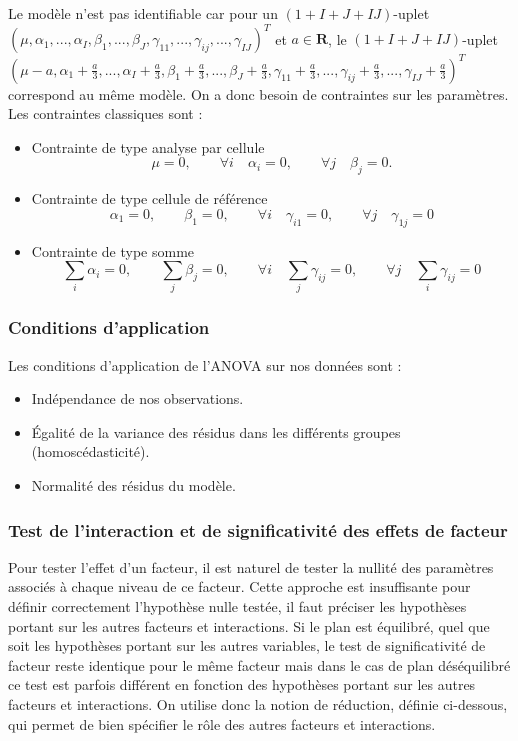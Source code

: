 \documentclass[12pt,a4paper]{article}
\newcommand{\bigbullet}{\ding{108}}
\begin{document}
	Le modèle n'est pas identifiable car pour un $(1+I+J+IJ)$-uplet $(\mu,\alpha_1,...,\alpha_I,\beta_1,...,\beta_J,\gamma_{11},...,\gamma_{ij},...,\gamma_{IJ})^T$ et $a \in \mathbf{R}$, le $(1+I+J+IJ)$-uplet $(\mu-a,\alpha_1+\frac{a}{3},...,\alpha_I+\frac{a}{3},\beta_1+\frac{a}{3},...,\beta_J+\frac{a}{3},\gamma_{11}+\frac{a}{3},...,\gamma_{ij}+\frac{a}{3},...,\gamma_{IJ}+\frac{a}{3})^T$ correspond au même modèle. On a donc besoin de contraintes sur les paramètres. Les contraintes classiques sont : 
	\begin{itemize}
		\item Contrainte de type analyse par cellule
		\begin{equation}
			\mu=0,\quad\quad \forall i \quad  \alpha_i=0, \quad\quad \forall  j  \quad \beta_j=0.
		\end{equation}
		\item Contrainte de type cellule de référence
		\begin{equation}
			\alpha_1=0,\quad\quad \beta_1=0,\quad\quad \forall i\quad \gamma_{i1}=0,\quad\quad \forall j \quad \gamma_{1j}=0
		\end{equation}
		\item Contrainte de type somme
		\begin{equation}
			\sum_{i}\alpha_i=0,\quad\quad\sum_{j}\beta_j=0,\quad\quad\forall i \quad \sum_{j}\gamma_{ij}=0,\quad\quad\forall j \quad\sum_{i}\gamma_{ij}=0
		\end{equation}
	\end{itemize}
	\subsubsection{Conditions d'application}
	Les conditions d'application de l'ANOVA sur nos données sont : 
	\begin{itemize}
		\item[\bigbullet] Indépendance de nos observations.
		\item[\bigbullet] Égalité de la variance des résidus dans les différents groupes (homoscédasticité).
		\item[\bigbullet] Normalité des résidus du modèle.
	\end{itemize}
	
	\subsubsection{Test de l'interaction et de significativité des effets de facteur}
	Pour tester l'effet d'un facteur, il est naturel de tester la nullité des paramètres associés à chaque niveau de ce facteur. Cette approche est insuffisante pour définir correctement l'hypothèse nulle testée, il faut préciser les hypothèses portant sur les autres facteurs et interactions. Si le plan est équilibré, quel que soit les hypothèses portant sur les autres variables, le test de significativité de facteur reste identique pour le même facteur mais dans le cas de plan déséquilibré ce test est parfois différent en fonction des hypothèses portant sur les autres facteurs et interactions. On utilise donc la notion de réduction, définie ci-dessous, qui permet de bien spécifier le rôle des autres facteurs et interactions.
	
\end{document}
